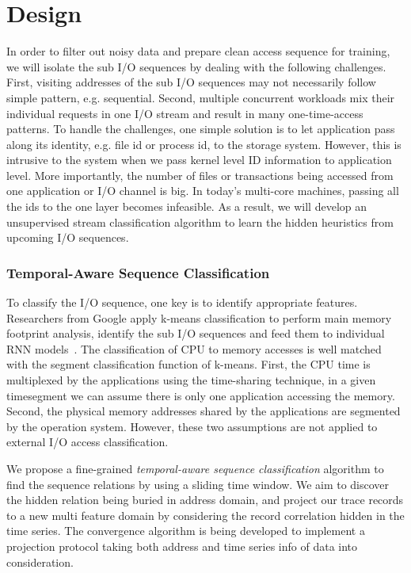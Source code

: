 \section{Design}

In order to filter out noisy data and prepare clean access sequence for training,
we will isolate the sub I/O sequences by dealing with the following challenges.
First, visiting addresses of the sub I/O sequences may not necessarily follow simple pattern, e.g. sequential.
Second, multiple concurrent workloads mix their individual requests in one I/O stream and result in many one-time-access patterns.
To handle the challenges, one simple solution is to let application pass along its identity,
e.g. file id or process id, to the storage system.
However, this is intrusive to the system when we pass kernel level ID information to application level.
More importantly, the number of files or transactions being accessed from one application or I/O channel is big.
In today's multi-core machines, passing all the ids to the one layer becomes infeasible.
As a result, we will develop an unsupervised stream classification algorithm to learn the hidden heuristics from upcoming I/O sequences.

\subsubsection*{Temporal-Aware Sequence Classification}

To classify the I/O sequence,
one key is to identify appropriate features.
Researchers from Google apply k-means classification to perform main memory
footprint analysis, identify the sub I/O sequences and feed them
to individual RNN models~\cite{hashemi2018learning, peled2018towards}.
The classification of CPU to memory accesses is well matched with
the segment classification function of k-means.
First, the CPU time is multiplexed by the applications using the time-sharing technique,
in a given timesegment we can assume there is only one application accessing the memory.
Second, the physical memory addresses shared by the applications are segmented by the operation system.
However, these two assumptions are not applied to external I/O access classification.

We propose a fine-grained \emph{temporal-aware sequence classification} algorithm
to find the sequence relations by using a sliding time window.
We aim to discover the hidden relation being buried in address domain,
and project our trace records to a new multi feature domain
by considering the record correlation hidden in the time series.
The convergence algorithm is being developed to implement a projection protocol
taking both address and time series info of data into consideration.

